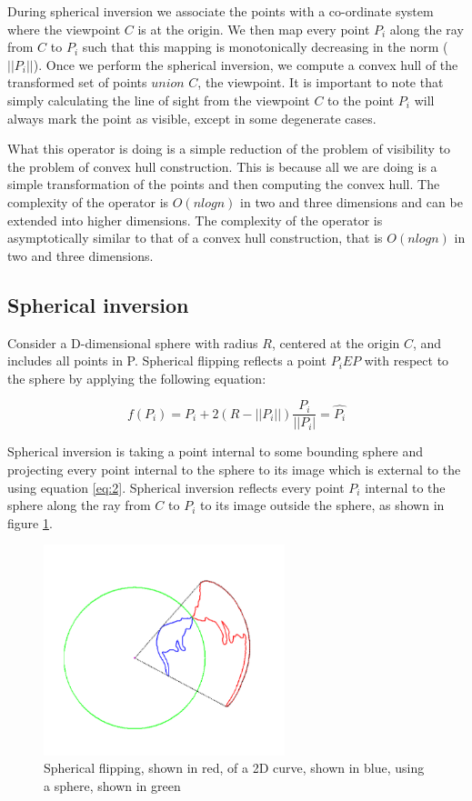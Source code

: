 \documentclass[11pt]{article}
\begin{document}
During spherical inversion we associate the points with a co-ordinate system where the viewpoint $C$ is at the origin. We then map every point $ P_{i} $ along the ray from $ C $ to $ P_{i} $ such that this mapping is monotonically decreasing in the norm ($ || P_{i} ||$). Once we perform the spherical inversion, we compute a convex hull of the transformed set of points $ union $ $ C$, the viewpoint. It is important to note that simply calculating the line of sight from the viewpoint $C$ to the point $ P_{i} $ will always mark the point as visible, except in some degenerate cases. 

What this operator is doing is a simple reduction of the problem of visibility to the problem of convex hull construction. This is because all we are doing is a simple transformation of the points and then computing the convex hull. The complexity of the operator is $ O(nlogn) $ in two and three dimensions and can be extended into higher dimensions. The complexity of the operator is asymptotically similar to that of a convex hull construction, that is $ O(nlogn) $ in two and three dimensions.

\subsection{Spherical inversion}
Consider a D-dimensional sphere with radius $ R $, centered at the origin $ C $, and includes all points in P. Spherical flipping reflects a point $ P_{i} E P $ with respect to the sphere by applying the following equation: 

\begin{equation}
\label{eq:2}
f(P_{i}) = P_{i} + 2 (R - ||P_{i}||) \dfrac{P_{i}}{||P_{i}|} = \widehat{P_{i}}
\end{equation}

Spherical inversion is taking a point internal to some bounding sphere and projecting every point internal to the sphere to its image which is external to the using equation \ref{eq:2}. Spherical inversion reflects every point $ P_{i} $ internal to the sphere along the ray from $ C $ to $ P_{i} $ to its image outside the sphere, as shown in figure \ref{fig:spherical-inversion-1}. 

\begin{figure}[h]
\includegraphics[width=7cm]{spherical-inversion-1}
\centering
\caption{Spherical flipping, shown in red, of a 2D curve, shown in blue, using a sphere, shown in green}
\label{fig:spherical-inversion-1}
\end{figure}
\end{document}
